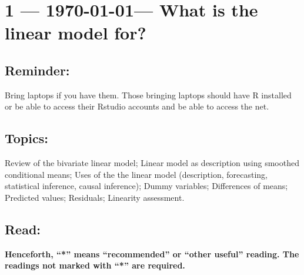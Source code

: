 \documentclass[10pt]{article}
\begin{document}
\section{1 --- \today --- What is the linear model for? }

\subsection{Reminder:} Bring laptops if you have them. Those bringing
laptops should have R installed or be able to access their Rstudio
accounts and be able to access the net.

\subsection{Topics:} Review of the bivariate linear model; Linear
model as description using smoothed conditional means; Uses of the the
linear model (description, forecasting, statistical inference, causal
inference); Dummy variables; Differences of means; Predicted values;
Residuals; Linearity assessment.







\subsection{Read:}
\textbf{Henceforth, ``*'' means ``recommended'' or ``other useful''
reading. The readings not marked with ``*'' are required.}
\end{document}
